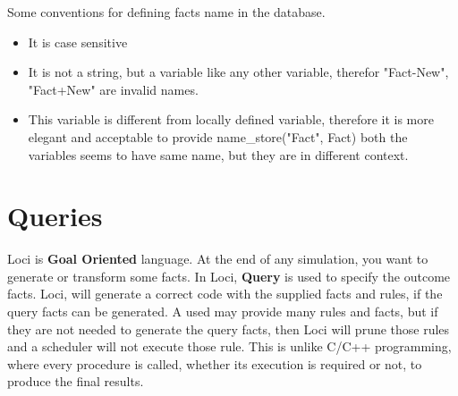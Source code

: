 \par Some conventions for defining facts name in the database.

\begin{itemize}
\item  It is case sensitive
\item  It is not a string, but a variable like any other variable, therefor
       "Fact-New", "Fact+New" are invalid names.
\item  This variable is different from locally defined variable, therefore 
       it is more elegant and acceptable to provide  name\_store("Fact", Fact)
       both the variables seems to have same name, but they are in different
       context.
\end{itemize}

\section { Queries }
Loci is {\bf Goal Oriented } language. At the end of any simulation, you want to
generate or transform some facts. In Loci, {\bf Query} is used to specify the outcome
facts. Loci, will generate a correct code with the supplied facts and rules, if
the query facts can be generated. A used may provide many rules and facts, but if 
they are not needed to generate the query facts, then Loci
will prune those rules and a scheduler will not execute those rule. This is unlike
C/C++ programming, where every procedure is called, whether its execution is 
required or not, to produce the final results.
